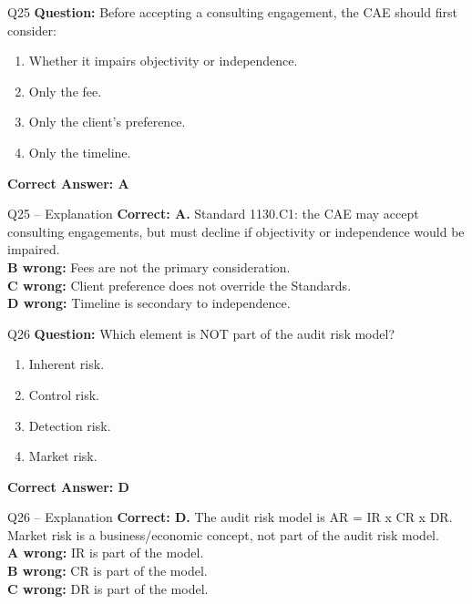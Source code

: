 \documentclass[aspectratio=169,10pt]{beamer}
\begin{document}
	\begin{frame}[t]{Q25}
		\small
		\textbf{Question:} Before accepting a consulting engagement, the CAE should first consider:
		\begin{enumerate}[label=\Alph*.,itemsep=1pt,topsep=2pt]
			\item Whether it impairs objectivity or independence.
			\item Only the fee.
			\item Only the client's preference.
			\item Only the timeline.
		\end{enumerate}
		\vspace{4pt}
		\textbf{Correct Answer: A}
	\end{frame}
	
	\begin{frame}[t]{Q25 -- Explanation}
		\small
		\textbf{Correct: A.} Standard 1130.C1: the CAE may accept consulting engagements, but must decline if objectivity or independence would be impaired. \\[4pt]
		\textbf{B wrong:} Fees are not the primary consideration. \\[2pt]
		\textbf{C wrong:} Client preference does not override the Standards. \\[2pt]
		\textbf{D wrong:} Timeline is secondary to independence.
	\end{frame}
	
	\begin{frame}[t]{Q26}
		\small
		\textbf{Question:} Which element is NOT part of the audit risk model?
		\begin{enumerate}[label=\Alph*.,itemsep=1pt,topsep=2pt]
			\item Inherent risk.
			\item Control risk.
			\item Detection risk.
			\item Market risk.
		\end{enumerate}
		\vspace{4pt}
		\textbf{Correct Answer: D}
	\end{frame}
	
	\begin{frame}[t]{Q26 -- Explanation}
		\small
		\textbf{Correct: D.} The audit risk model is AR = IR x CR x DR. Market risk is a business/economic concept, not part of the audit risk model. \\[4pt]
		\textbf{A wrong:} IR is part of the model. \\[2pt]
		\textbf{B wrong:} CR is part of the model. \\[2pt]
		\textbf{C wrong:} DR is part of the model.
	\end{frame}
	
\end{document}
